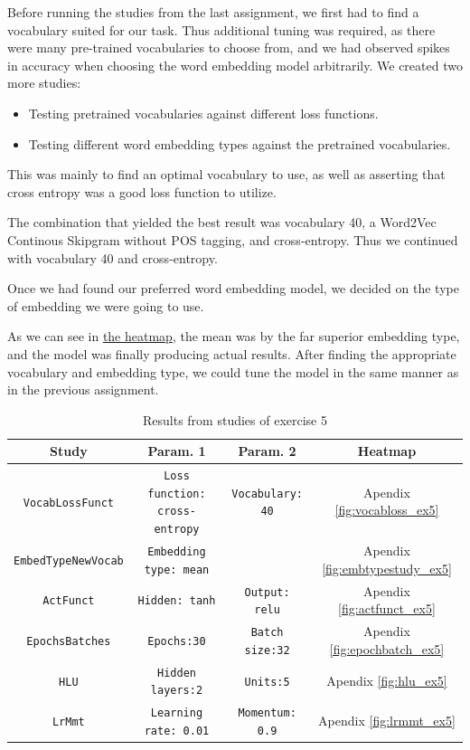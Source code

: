 Before running the studies from the last assignment, we first had to find a vocabulary suited for our task. Thus additional tuning was required, as there were many pre-trained vocabularies to choose from, and we had observed spikes in accuracy when choosing the word embedding model arbitrarily. We created two more studies:
\begin{itemize}
    \item Testing pretrained vocabularies against different loss functions.
    \item Testing different word embedding types against the pretrained vocabularies.
\end{itemize}
\quad This was mainly to find an optimal vocabulary to use, as well as asserting that cross entropy was a good loss function to utilize.\newline

The combination that yielded the best result was vocabulary 40, a Word2Vec Continous Skipgram without POS tagging, and cross-entropy. Thus we continued with vocabulary 40 and cross-entropy. 

Once we had found our preferred word embedding model, we decided on the type of embedding we were going to use.

\quad As we can see in \href{fig:emb_type}{the heatmap}, the mean was by the far superior embedding type, and the model was finally producing actual results. After finding the appropriate vocabulary and embedding type, we could tune the model in the same manner as in the previous assignment.

\begin{table}[H]
    \centering
    \begin{tabular}{c|c|c|c}
        \textbf{Study} & \textbf{Param. 1} & \textbf{Param. 2} & \textbf{Heatmap}\\
        \hline
        \texttt{VocabLossFunct} &  \texttt{Loss function: cross-entropy}  &  \texttt{Vocabulary: 40} & Apendix \ref{fig:vocabloss_ex5} \\
        \texttt{EmbedTypeNewVocab} &  \texttt{Embedding type: mean}  &  \texttt{} & Apendix \ref{fig:embtypestudy_ex5} \\
        \texttt{ActFunct} &  \texttt{Hidden: tanh}  &  \texttt{Output: relu} & Apendix \ref{fig:actfunct_ex5} \\
        \texttt{EpochsBatches} &  \texttt{Epochs:30}  &  \texttt{Batch size:32} & Apendix \ref{fig:epochbatch_ex5} \\
        \texttt{HLU} &  \texttt{Hidden layers:2}  &  \texttt{Units:5} & Apendix \ref{fig:hlu_ex5} \\
        \texttt{LrMmt} &  \texttt{Learning rate: 0.01}  &  \texttt{Momentum: 0.9} & Apendix \ref{fig:lrmmt_ex5}\\
    \end{tabular}
    \caption{Results from studies of exercise 5}
    \label{tab:ex5_studies}
\end{table}

